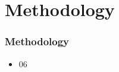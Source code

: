 \section{Methodology}

\begin{frame}%
\frametitle{Methodology}

\begin{itemize}
  \item 06
\end{itemize}

\end{frame}